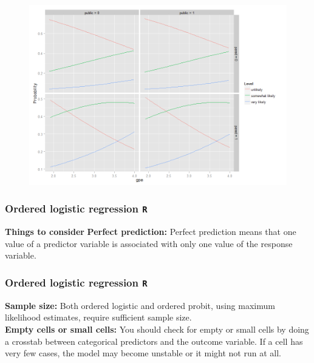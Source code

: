 \documentclass[00-GLMregslides.tex]{subfiles}
\begin{document}
\begin{frame}
	
	
\begin{figure}
\centering
\includegraphics[width=0.99\linewidth]{ologit3}
\end{figure}
	
\end{frame}
\begin{frame}[fragile]
	\frametitle{Ordered logistic regression \texttt{R} }
	\Large
\textbf{Things to consider
}
\textbf{Perfect prediction: }Perfect prediction means that one value of a predictor variable is associated with only one value of the response variable. 
\end{frame}

\begin{frame}[fragile]
	\frametitle{Ordered logistic regression \texttt{R} }
	\Large
\textbf{Sample size:} Both ordered logistic and ordered probit, using maximum likelihood estimates, require sufficient sample size.
\\
\textbf{Empty cells or small cells:} You should check for empty or small cells by doing a crosstab between categorical predictors and the outcome variable. If a cell has very few cases, the model may become unstable or it might not run at all.
\end{frame}
\end{document}
